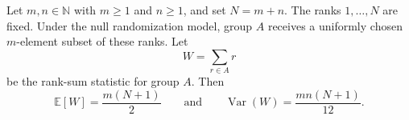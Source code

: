 \begin{theorem}
Let $m,n\in\mathbb{N}$ with $m\ge 1$ and $n\ge 1$, and set $N=m+n$.
The ranks $1,\ldots,N$ are fixed. Under the null randomization model, group
$A$ receives a uniformly chosen $m$-element subset of these ranks. Let
\[
W=\sum_{r\in A} r
\]
be the rank-sum statistic for group $A$. Then
\[
\mathbb E[W]=\frac{m(N+1)}{2}
\qquad\text{and}\qquad
\operatorname{Var}(W)=\frac{mn(N+1)}{12}.
\]
\end{theorem}
